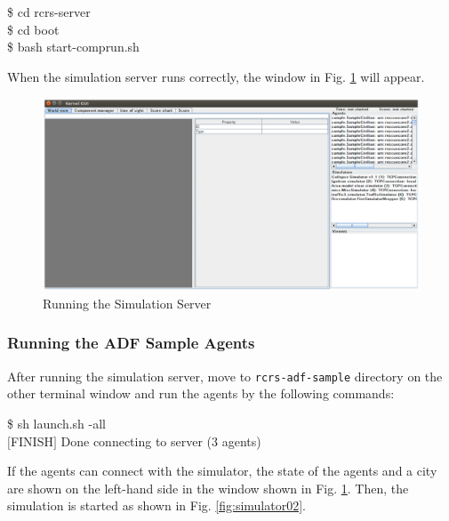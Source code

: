 \documentclass{article}
\begin{document}
\begin{center}
   \begin{tcolorbox}[title=Running Simulation Server, width=.98\linewidth]
    {\ttfamily
    \$ cd rcrs-server\\
    \$ cd boot\\
    \$ bash start-comprun.sh
    }
  \end{tcolorbox}
\end{center}

When the simulation server runs correctly, the window in Fig. \ref{fig:simulator01} will appear.

\begin{figure}[ht]
 \begin{center}
  \includegraphics[width=.9\linewidth]{figs/simulator01.eps}
  \caption{Running the Simulation Server}
  \label{fig:simulator01}
 \end{center}
\end{figure}
\subsubsection{Running the ADF Sample Agents}
After running the simulation server, move to \texttt{rcrs-adf-sample} directory on the other terminal window and run the agents by the following commands:

\begin{center}
   \begin{tcolorbox}[title=Running Sample Agents, width=.98\linewidth]
    {\ttfamily
    \$ sh launch.sh -all\\
    $[$FINISH$]$ Done connecting to server (3 agents)
    }
  \end{tcolorbox}
\end{center}

If the agents can connect with the simulator, the state of the agents and a city are shown on the left-hand side in the window shown in Fig. \ref{fig:simulator01}. Then, the simulation is started as shown in Fig. \ref{fig:simulator02}.
\end{document}
